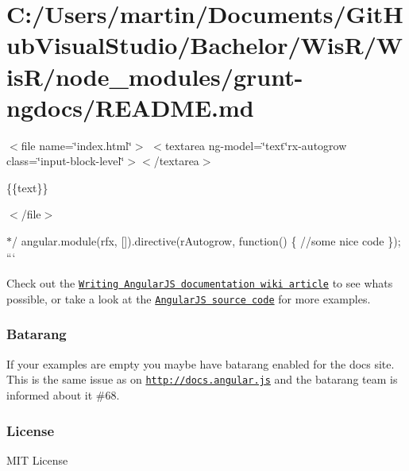 \hypertarget{_c_1_2_users_2martin_2_documents_2_git_hub_visual_studio_2_bachelor_2_wis_r_2_wis_r_2node_module442882db47c09482797f86bb499e8b95}{}\section{C\+:/\+Users/martin/\+Documents/\+Git\+Hub\+Visual\+Studio/\+Bachelor/\+Wis\+R/\+Wis\+R/node\+\_\+modules/grunt-\/ngdocs/\+R\+E\+A\+D\+M\+E.\+md}
$<$file name=\char`\"{}index.\+html\char`\"{}$>$ $<$textarea ng-\/model=\char`\"{}text\char`\"{}rx-\/autogrow class=\char`\"{}input-\/block-\/level\char`\"{}$>$$<$/textarea$>$ 
\begin{DoxyPre}\{\{text\}\}\end{DoxyPre}
 $<$/file$>$ 

$\ast$/ angular.\+module(\textquotesingle{}rfx\textquotesingle{}, \mbox{[}\mbox{]}).directive(\textquotesingle{}r\+Autogrow\textquotesingle{}, function() \{ //some nice code \}); ```

Check out the \href{https://github.com/angular/angular.js/wiki/Writing-AngularJS-Documentation}{\tt Writing Angular\+J\+S documentation wiki article} to see what\textquotesingle{}s possible, or take a look at the \href{https://github.com/angular/angular.js/tree/master/src/ng}{\tt Angular\+J\+S source code} for more examples.

\subsubsection*{Batarang}

If your examples are empty you maybe have batarang enabled for the docs site. This is the same issue as on \href{http://docs.angular.js}{\tt http\+://docs.\+angular.\+js} and the batarang team is informed about it \#68.

\subsubsection*{License}

M\+I\+T License


